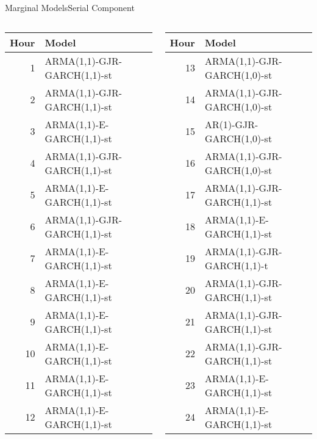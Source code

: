 \begin{frame}{Marginal Models}{Serial Component}
  \begin{columns}
    \footnotesize
    \begin{column}{0.49\textwidth}
      \begin{tabular}{rl}
        \toprule
        Hour & Model \\
        \midrule
        1 & ARMA(1,1)-GJR-GARCH(1,1)-st \\
        2 & ARMA(1,1)-GJR-GARCH(1,1)-st \\
        3 & ARMA(1,1)-E-GARCH(1,1)-st \\
        4 & ARMA(1,1)-GJR-GARCH(1,1)-st \\
        5 & ARMA(1,1)-E-GARCH(1,1)-st \\
        6 & ARMA(1,1)-GJR-GARCH(1,1)-st \\
        7 & ARMA(1,1)-E-GARCH(1,1)-st \\
        8 & ARMA(1,1)-E-GARCH(1,1)-st \\
        9 & ARMA(1,1)-E-GARCH(1,1)-st \\
        10 & ARMA(1,1)-E-GARCH(1,1)-st \\
        11 & ARMA(1,1)-E-GARCH(1,1)-st \\
        12 & ARMA(1,1)-E-GARCH(1,1)-st \\
        \bottomrule
      \end{tabular}
    \end{column}
    \begin{column}{0.49\textwidth}
      \begin{tabular}{rl}
        \toprule
        Hour & Model \\
        \midrule
        13 & ARMA(1,1)-GJR-GARCH(1,0)-st \\
        14 & ARMA(1,1)-GJR-GARCH(1,0)-st \\
        15 & AR(1)-GJR-GARCH(1,0)-st \\
        16 & ARMA(1,1)-GJR-GARCH(1,0)-st \\
        17 & ARMA(1,1)-GJR-GARCH(1,1)-st \\
        18 & ARMA(1,1)-E-GARCH(1,1)-st \\
        19 & ARMA(1,1)-GJR-GARCH(1,1)-t \\
        20 & ARMA(1,1)-GJR-GARCH(1,1)-st \\
        21 & ARMA(1,1)-GJR-GARCH(1,1)-st \\
        22 & ARMA(1,1)-GJR-GARCH(1,1)-st \\
        23 & ARMA(1,1)-E-GARCH(1,1)-st \\
        24 & ARMA(1,1)-E-GARCH(1,1)-st \\
        \bottomrule
      \end{tabular}
    \end{column}
  \end{columns}
\end{frame}

